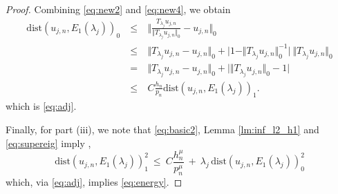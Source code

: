 \documentclass[preprint,12pt]{elsarticle}
\begin{document}
\begin{proof}
Combining \eqref{eq:new2} and  \eqref{eq:new4},  we obtain
\begin{eqnarray*} 
\mathrm{dist}(u_{j,n}, E_1(\lambda_j))_0 \ & \leq & \ 
\bigg\Vert \frac{T_{\lambda_j}u_{j, n}}{\Vert T_{\lambda_j}u_{j, n}\Vert_0} - u_{j, n}
  \bigg\Vert_0 \\
& \leq & \ 
\bigg\Vert {T_{\lambda_j}u_{j, n}} - u_{j, n}
  \bigg\Vert_0 + \bigg\vert 1 - \Vert T_{\lambda_j}u_{j,n}\Vert_0^{-1}\bigg\vert  \ \Vert T_{\lambda_j}u_{j,n}\Vert_0\\
& =  & \ 
\bigg\Vert {T_{\lambda_j}u_{j, n}} - u_{j, n}
  \bigg\Vert_0 + \bigg\vert  \Vert T_{\lambda_j}u_{j,n}\Vert_0 - 1 \bigg\vert 
\\
& \leq & \ C \frac{h_n}{p_n} \mathrm{dist} (u_{j,n} ,
E_1(\lambda_j))_1 .
\end{eqnarray*}
which is \eqref{eq:adj}. 

Finally,  for part (iii),  we note that 
\eqref{eq:basic2},  Lemma \ref{lm:inf_l2_h1} and  \eqref{eq:supereig}
imply ,
\begin{equation}
\mathrm{dist}(u_{j,n}, E_1(\lambda_j))_1^2 \ \leq\  C
\frac{h_n^{\mu}}{p_n^{\mu}} \ + \ \lambda_j\,  \mathrm{dist}(u_{j,n}, E_1(\lambda_j))_0^2
\end{equation}
which, via \eqref{eq:adj}, implies  \eqref{eq:energy}.


\end{proof}



\end{document}
